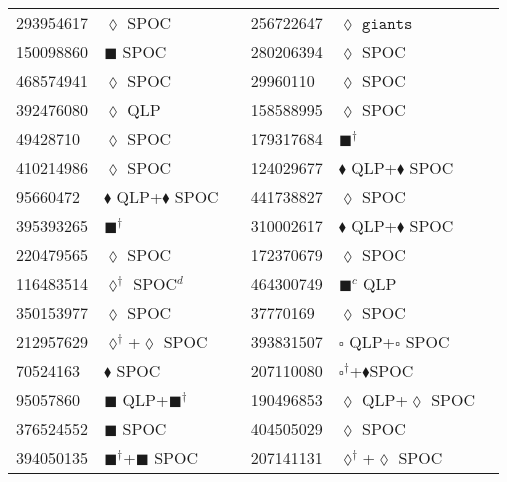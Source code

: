\begin{longtable}{llrllr}
293954617 & $\lozenge$ SPOC & \cite{TIC_293954617} & 256722647 & $\lozenge$ $\texttt{giants}$ & \cite{TIC_348835438} \\
150098860 & $\blacksquare$ SPOC & \cite{TIC_150098860} & 280206394 & $\lozenge$ SPOC& \cite{TIC_280206394} \\
468574941 & $\lozenge$ SPOC & \cite{TIC_376637093} & 29960110 & $\lozenge$ SPOC & \cite{TIC_29960110} \\
392476080 & $\lozenge$ QLP & \cite{TIC_392476080} & 158588995 & $\lozenge$ SPOC & \cite{TIC_158588995} \\
49428710 & $\lozenge$ SPOC & \cite{TIC_219016883} & 179317684 & $\blacksquare^\dagger$ & \cite{TIC_179317684} \\
410214986 & $\lozenge$ SPOC & \cite{TIC_410214986} & 124029677 & $\blacklozenge$ QLP+$\blacklozenge$ SPOC & \cite{TIC_124029677} \\
95660472 & $\blacklozenge$ QLP+$\blacklozenge$ SPOC & \cite{TIC_156648452} & 441738827 & $\lozenge$ SPOC & \cite{TIC_441738827} \\
395393265 & $\blacksquare^\dagger$ & \cite{TIC_428787891} & 310002617 & $\blacklozenge$ QLP+$\blacklozenge$ SPOC & \cite{TIC_156648452} \\
220479565 & $\lozenge$ SPOC & \cite{TIC_220479565} & 172370679 & $\lozenge$ SPOC & \cite{TIC_172370679} \\
116483514 & $\lozenge^\dagger$ SPOC$^d$ & \cite{TIC_10837041} & 464300749 & $\blacksquare^c$ QLP & \cite{TIC_464300749} \\
350153977 & $\lozenge$ SPOC & \cite{TIC_350153977} & 37770169 & $\lozenge$ SPOC & \cite{TIC_70513361} \\
212957629 & $\lozenge^\dagger$+$\lozenge$ SPOC & \cite{TIC_212957629} & 393831507 & $\square$ QLP+$\square$ SPOC & \cite{TIC_393831507} \\
70524163 &$\blacklozenge$ SPOC & \cite{TIC_70524163} & 207110080 & $\square^\dagger$+$\blacklozenge$SPOC & \cite{TIC_207110080} \\
95057860 & $\blacksquare$ QLP+$\blacksquare^\dagger$ & \cite{TIC_95057860} & 190496853 & $\lozenge$ QLP+$\lozenge$ SPOC & \cite{TIC_83092282} \\
376524552 & $\blacksquare$ SPOC & \cite{TIC_428787891} & 404505029 & $\lozenge$ SPOC & \cite{TIC_404505029} \\
394050135 & $\blacksquare^\dagger$+$\blacksquare$ SPOC & \cite{TIC_428787891} & 207141131 & $\lozenge^\dagger$+$\lozenge$ SPOC & \cite{TIC_207141131} \\

\end{longtable}
